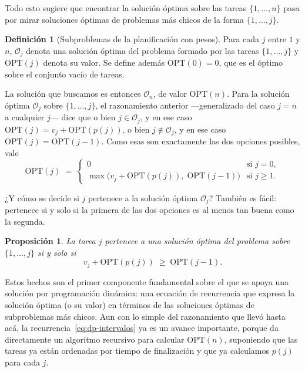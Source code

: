 \documentclass[12pt, spanish, oneside, openany]{book}
\theoremstyle{uprightplain}
\newtheorem{proposicion}[teorema]{Proposición}
\theoremstyle{definition}
\newtheorem{definicion}[teorema]{Definición}
\theoremstyle{remark}
\theoremstyle{definition}
\newcommand{\OPT}{\mathrm{OPT}} %
\begin{document}
Todo esto sugiere que encontrar la solución óptima sobre las tareas $\{1,\dots,n\}$ pasa por mirar soluciones óptimas de problemas más chicos de la forma $\{1,\dots,j\}$.

\begin{definicion}[Subproblemas de la planificación con pesos]
\label{def:dp-opt-intervalos}
Para cada $j$ entre $1$ y $n$, $\mathcal{O}_j$ denota una solución óptima del problema formado por las tareas $\{1,\dots,j\}$ y $\OPT(j)$ denota su valor. Se define además $\OPT(0)=0$, que es el óptimo sobre el conjunto vacío de tareas.
\end{definicion}

La solución que buscamos es entonces $\mathcal{O}_n$, de valor $\OPT(n)$. Para la solución óptima $\mathcal{O}_j$ sobre $\{1,\dots,j\}$, el razonamiento anterior ---generalizado del caso $j=n$ a cualquier $j$--- dice que o bien $j\in\mathcal{O}_j$, y en ese caso $\OPT(j)=v_j+\OPT(p(j))$, o bien $j\notin\mathcal{O}_j$, y en ese caso $\OPT(j)=\OPT(j-1)$. Como esas son exactamente las dos opciones posibles, vale
\begin{equation}
\label{eq:dp-intervalos}
\OPT(j) \;=\;
\begin{cases}
0 & \text{si } j=0,\\[2pt]
\max\bigl(v_j+\OPT(p(j)),\;\OPT(j-1)\bigr) & \text{si } j\ge 1 .
\end{cases}
\end{equation}

¿Y cómo se decide si $j$ pertenece a la solución óptima $\mathcal{O}_j$? También es fácil: pertenece si y solo si la primera de las dos opciones es al menos tan buena como la segunda.

\begin{proposicion}
\label{prop:dp-j-en-opt}
La tarea $j$ pertenece a una solución óptima del problema sobre $\{1,\dots,j\}$ si y solo si
\[
v_j+\OPT(p(j)) \;\ge\; \OPT(j-1).
\]
\end{proposicion}

Estos hechos son el primer componente fundamental sobre el que se apoya una solución por programación dinámica: una ecuación de recurrencia que expresa la solución óptima (o su valor) en términos de las soluciones óptimas de subproblemas más chicos. Aun con lo simple del razonamiento que llevó hasta acá, la recurrencia~\eqref{eq:dp-intervalos} ya es un avance importante, porque da directamente un algoritmo recursivo para calcular $\OPT(n)$, suponiendo que las tareas ya están ordenadas por tiempo de finalización y que ya calculamos $p(j)$ para cada $j$.
\end{document}

